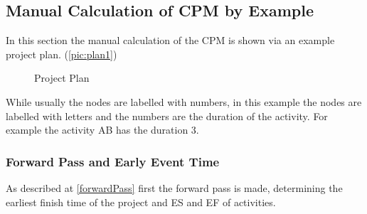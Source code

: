 \newpage

\subsection{Manual Calculation of CPM by Example}
In this section the manual calculation of the CPM is shown via an example project plan. (\autoref{pic:plan1})
\begin{figure}[h] 
\centerline{}
\caption{Project Plan}
\label{pic:plan1}
\end{figure}
While usually the nodes are labelled with numbers, in this example the nodes are labelled with letters and the numbers are the duration of the activity. For example the activity AB has the duration 3.

\subsubsection{Forward Pass and Early Event Time}
As described at \ref{forwardPass} first the forward pass is made, determining the earliest finish time of the project and ES and EF of activities.

